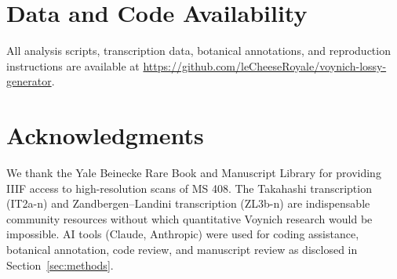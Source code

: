 \documentclass[12pt]{article}
\begin{document}
\section*{Data and Code Availability}
All analysis scripts, transcription data, botanical annotations, and reproduction instructions are available at \url{https://github.com/leCheeseRoyale/voynich-lossy-generator}.

\section*{Acknowledgments}

We thank the Yale Beinecke Rare Book and Manuscript Library for providing IIIF access to high-resolution scans of MS 408. The Takahashi transcription (IT2a-n) and Zandbergen--Landini transcription (ZL3b-n) are indispensable community resources without which quantitative Voynich research would be impossible. AI tools (Claude, Anthropic) were used for coding assistance, botanical annotation, code review, and manuscript review as disclosed in Section~\ref{sec:methods}.
\end{document}

